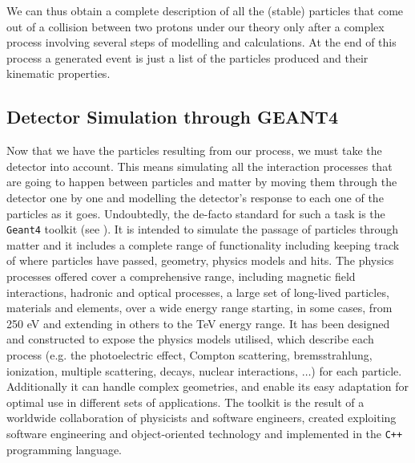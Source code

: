 We can thus obtain a complete description of all the (stable) particles that come out of a collision between two protons under our theory only after a complex process involving several steps of modelling and calculations. At the end of this process a generated event is just a list of the particles produced and their kinematic properties.


\subsection{Detector Simulation through GEANT4}

Now that we have the particles resulting from our process, we must take the detector into account. This means simulating all the interaction processes that are going to happen between particles and matter by moving them through the detector one by one and modelling the detector’s response to each one of the particles as it goes. 
Undoubtedly, the de-facto standard for such a task is the \texttt{Geant4} toolkit (see \cite{AGOSTINELLI2003250}). It is intended to simulate the passage of particles through matter and it includes a complete range of functionality including keeping track of where particles have passed, geometry, physics models and hits. The physics processes offered cover a comprehensive range, including magnetic field interactions, hadronic and optical processes, a large set of long-lived particles, materials and elements, over a wide energy range starting, in some cases, from 250 eV and extending in others to the TeV energy range. It has been designed and constructed to expose the physics models utilised, which describe each process (e.g. the photoelectric effect, Compton scattering, bremsstrahlung, ionization, multiple scattering, decays, nuclear interactions, $\dots$) for each particle. Additionally it can handle complex geometries, and enable its easy adaptation for optimal use in different sets of applications. The toolkit is the result of a worldwide collaboration of physicists and software engineers, created exploiting software engineering and object-oriented technology and implemented in the \texttt{C++} programming language.


